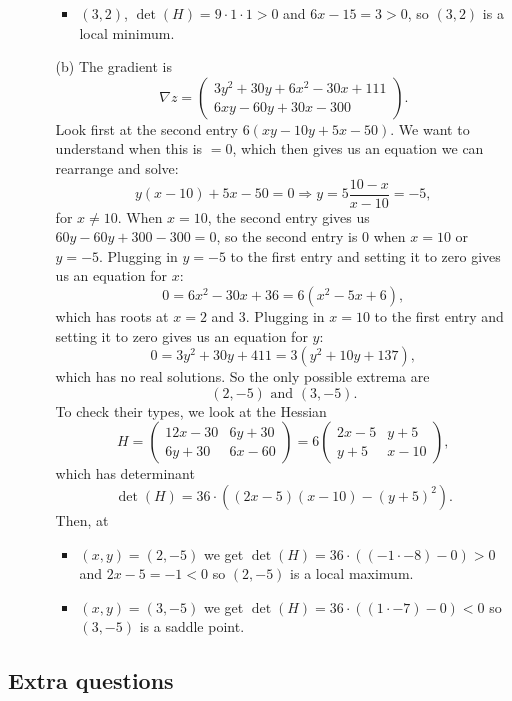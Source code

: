 \documentclass[11pt,a4paper]{scrartcl}
\begin{document}
\begin{enumerate}
\begin{itemize}
\begin{itemize}
			\item $(3,2)$, $\det(H) = 9\cdot 1 \cdot 1 > 0$ and $6x - 15 = 3 > 0$, so
			$(3,2)$ is a local minimum.
		\end{itemize}
		\item[(b)] The gradient is
		\[\nabla z = \left(\begin{array}{c}
		3y^2 + 30y + 6x^2 - 30x + 111 \\
		6xy - 60y + 30x - 300
		\end{array}\right).\]
		Look first at the second entry
		$6(xy-10y+5x-50)$.
		We want to understand when this is $=0$, 
		which then gives us an equation we can rearrange and solve:
		\[y(x-10) + 5x - 50 = 0 \Rightarrow y = 5\frac{10-x}{x-10} = -5,\]
		for $x \neq 10$. When $x = 10$,
		the second entry gives us
		$60y-60y + 300 - 300 = 0$,
		so the second entry is 0 when $x = 10$ or $y = -5$.
		Plugging in $y = -5$ to the first entry and setting it to 
		zero gives us an
		equation for $x$:
		\[0 = 6x^2 - 30x + 36 = 6(x^2 - 5x +6),\]
		which has roots at $x = 2$ and 3.
		Plugging in $x = 10$ to the first entry and setting it to zero
		gives us an equation for $y$:
		\[0 = 3y^2 + 30y + 411 = 3(y^2 + 10y + 137),\]
		which has no real solutions.
		So the only possible extrema are
		\[(2,-5) \text{ and } (3,-5).\]
		To check their types, we look at the Hessian
		\[H = \left(\begin{array}{cc}
		12x - 30 & 6y+30 \\
		6y +30 & 6x - 60
		\end{array}\right)
		=6\left(\begin{array}{cc}
		2x-5 & y + 5 \\
		y + 5 & x-10
		\end{array}\right),\]
		which has determinant 
		$$\det(H) = 36\cdot ((2x-5)(x-10)-(y+5)^2).$$
		Then, at
		\begin{itemize}
			\item $(x,y) = (2,-5)$ we get $\det(H) = 36\cdot ((-1\cdot-8) - 0) > 0$ and $2x-5 = -1 < 0$ so $(2,-5)$ is a local maximum.
			\item $(x,y) = (3,-5)$ we get $\det(H) = 36\cdot ((1\cdot -7) - 0) < 0$ so $(3,-5)$ is a saddle point.
		\end{itemize}
\end{itemize}



\end{enumerate}

\subsection*{Extra questions}
\end{document}
